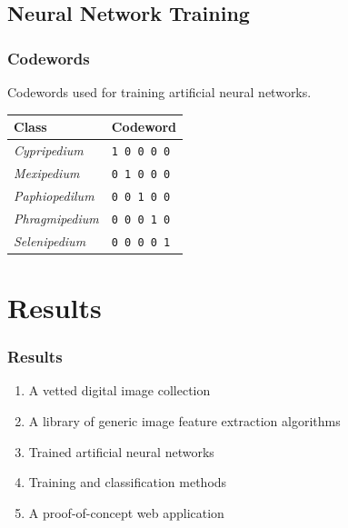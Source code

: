 \documentclass[]{beamer}
\begin{document}
    \subsection{Neural Network Training}



    \begin{frame}
        \frametitle{Codewords}

        Codewords used for training artificial neural networks.

        \begin{table}[h]\scriptsize
            \begin{center}
            \begin{tabular}{ll}
            \toprule
            \textbf{Class} & \textbf{Codeword} \\
            \midrule
            \textit{Cypripedium}    & \texttt{1 0 0 0 0} \\
            \textit{Mexipedium}     & \texttt{0 1 0 0 0} \\
            \textit{Paphiopedilum}  & \texttt{0 0 1 0 0} \\
            \textit{Phragmipedium}  & \texttt{0 0 0 1 0} \\
            \textit{Selenipedium}   & \texttt{0 0 0 0 1} \\
            \bottomrule
            \end{tabular}
            \end{center}
        \end{table}
    \end{frame}

\section{Results}
	\begin{frame}
		\frametitle{Results}
        \begin{enumerate}
            \item A vetted digital image collection
            \item A library of generic image feature extraction algorithms
            \item Trained artificial neural networks            
            \item Training and classification methods
            \item A proof-of-concept web application
        \end{enumerate}		
	\end{frame}
		
\end{document}
